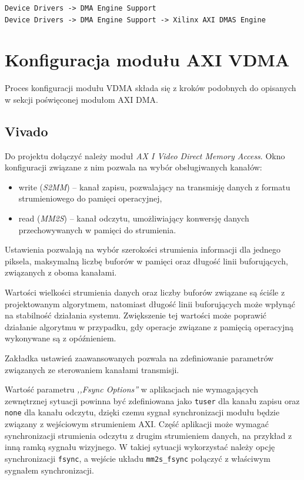 {\begin{lstlisting}[breaklines]
Device Drivers -> DMA Engine Support
Device Drivers -> DMA Engine Support -> Xilinx AXI DMAS Engine
\end{lstlisting}

\section{Konfiguracja modułu AXI VDMA}
\label{sec:vivado-axi-vdma}
Proces konfiguracji modułu VDMA składa się z kroków podobnych do opisanych w sekcji poświęconej modułom AXI DMA.

\subsection{Vivado}
Do projektu dołączyć należy moduł \textit{AX I Video Direct Memory Access}. Okno konfiguracji związane z nim pozwala na wybór obsługiwanych kanałów:
\begin{itemize}
	\item write (\emph{S2MM}) -- kanał zapisu, pozwalający na transmisję danych z formatu strumieniowego do pamięci operacyjnej,
	\item read (\emph{MM2S}) -- kanał odczytu, umożliwiający konwersję danych przechowywanych w pamięci do strumienia.
\end{itemize}

Ustawienia pozwalają na wybór szerokości strumienia informacji dla jednego piksela, maksymalną liczbę buforów w pamięci oraz długość linii buforujących, związanych z oboma kanałami.

Wartości wielkości strumienia danych oraz liczby buforów związane są ściśle z projektowanym algorytmem, natomiast długość linii buforujących może wpłynąć na stabilność działania systemu. Zwiększenie tej wartości może poprawić działanie algorytmu w przypadku, gdy operacje związane z pamięcią operacyjną wykonywane są z opóźnieniem.

Zakładka ustawień zaawansowanych pozwala na zdefiniowanie parametrów związanych ze sterowaniem kanałami transmisji.

Wartość parametru \textit{,,Fsync Options''} w aplikacjach nie wymagających zewnętrznej sytuacji powinna być zdefiniowana jako \texttt{tuser} dla kanału zapisu oraz \texttt{none} dla kanału odczytu, dzięki czemu sygnał synchronizacji modułu będzie związany z wejściowym strumieniem AXI. Część aplikacji może wymagać synchronizacji strumienia odczytu z drugim strumieniem danych, na przykład z inną ramką sygnału wizyjnego. W takiej sytuacji wykorzystać należy opcję synchronizacji \texttt{fsync}, a wejście układu \texttt{mm2s\_fsync} połączyć z właściwym sygnałem synchronizacji.

}
